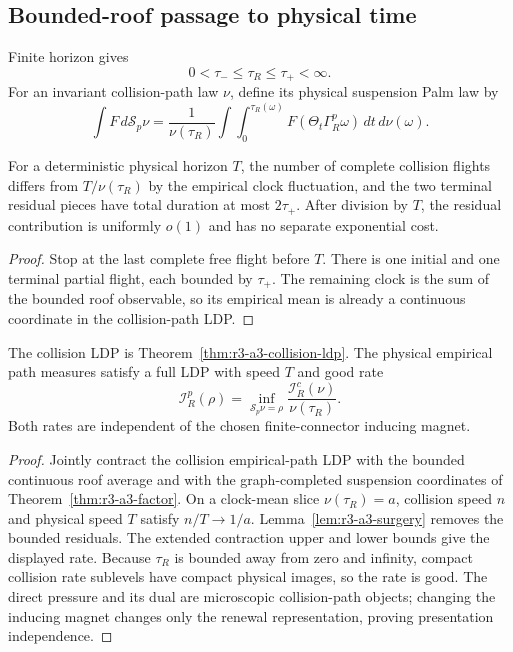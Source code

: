 \subsection{Bounded-roof passage to physical time}

Finite horizon gives
\[
 0<\tau_-\le\tau_R\le\tau_+<\infty.
\]
For an invariant collision-path law \(\nu\), define its physical suspension
Palm law by
\[
 \int F\,d\mathscr S_p\nu
 =\frac1{\nu(\tau_R)}
 \int\int_0^{\tau_R(\omega)}
 F(\Theta_t\Gamma_R^p\omega)\,dt\,d\nu(\omega).
\]

\begin{lemma}
\label{lem:r3-a3-surgery}
For a deterministic physical horizon \(T\), the number of complete collision
flights differs from \(T/\nu(\tau_R)\) by the empirical clock fluctuation, and
the two terminal residual pieces have total duration at most \(2\tau_+\).
After division by \(T\), the residual contribution is uniformly \(o(1)\) and
has no separate exponential cost.
\end{lemma}

\begin{proof}
Stop at the last complete free flight before \(T\).  There is one initial and
one terminal partial flight, each bounded by \(\tau_+\).  The remaining clock
is the sum of the bounded roof observable, so its empirical mean is already a
continuous coordinate in the collision-path LDP.
\end{proof}

\begin{theorem}
\label{thm:r3-a3-two-clock}
The collision LDP is Theorem~\ref{thm:r3-a3-collision-ldp}.  The physical
empirical path measures satisfy a full LDP with speed \(T\) and good rate
\[
 \boxed{
 \mathcal I_R^p(\rho)=
 \inf_{\mathscr S_p\nu=\rho}
 \frac{\mathcal I_R^c(\nu)}{\nu(\tau_R)}.}
\]
Both rates are independent of the chosen finite-connector inducing magnet.
\end{theorem}

\begin{proof}
Jointly contract the collision empirical-path LDP with the bounded continuous
roof average and with the graph-completed suspension coordinates of
Theorem~\ref{thm:r3-a3-factor}.  On a clock-mean slice
\(\nu(\tau_R)=a\), collision speed \(n\) and physical speed \(T\) satisfy
\(n/T\to1/a\).  Lemma~\ref{lem:r3-a3-surgery} removes the bounded residuals.
The extended contraction upper and lower bounds give the displayed rate.
Because \(\tau_R\) is bounded away from zero and infinity, compact collision
rate sublevels have compact physical images, so the rate is good.  The direct
pressure and its dual are microscopic collision-path objects; changing the
inducing magnet changes only the renewal representation, proving
presentation independence.
\end{proof}

